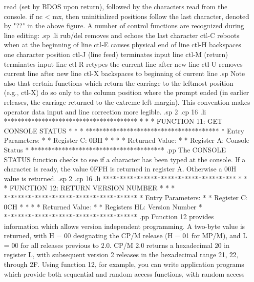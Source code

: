 read (set by BDOS upon return), followed by the characters
read from the console.  if nc < mx, then uninitialized
positions follow the last character, denoted by "??" in
the above figure.
A number of control functions are recognized during line
editing:
.sp
.li
         rub/del removes and echoes the last character
          ctl-C  reboots when at the beginning of line
          ctl-E  causes physical end of line
          ctl-H  backspaces one character position
          ctl-J  (line feed) terminates input line
          ctl-M  (return) terminates input line
          ctl-R  retypes the current line after new line
          ctl-U  removes current line after new line
          ctl-X  backspaces to beginning of current line
.sp
Note also that certain functions which return the carriage to
the leftmost position (e.g., ctl-X) do so only to the column
position where the prompt ended (in earlier releases, the carriage
returned to the extreme left margin).  This convention
makes operator data input and line correction more legible.
.sp 2
.cp 16
.li
***************************************
*                                     *
*  FUNCTION 11: GET CONSOLE STATUS    *
*                                     *
***************************************
*  Entry Parameters:                  *
*      Register   C:  0BH             *
*                                     *
*  Returned   Value:                  *
*      Register   A:  Console Status  *
***************************************
.pp
The CONSOLE STATUS function checks to see if a character
has been typed at the console.  If a character is ready,
the value 0FFH is returned in register A.  Otherwise a
00H value is returned.
.sp 2
.cp 16
.li
***************************************
*                                     *
*  FUNCTION 12: RETURN VERSION NUMBER *
*                                     *
***************************************
*  Entry Parameters:                  *
*      Register   C:  0CH             *
*                                     *
*  Returned   Value:                  *
*      Registers HL:  Version Number  *
***************************************
.pp
Function 12 provides information which
allows version independent programming.
A two-byte value is returned, with H = 00 designating the CP/M
release (H = 01 for MP/M), and L = 00 for all releases
previous to 2.0.  CP/M 2.0 returns a hexadecimal 20 in register
L, with subsequent version 2 releases in the hexadecimal
range 21, 22, through 2F.  Using function 12, for example,
you can write application programs which provide both
sequential and random access functions, with random access
